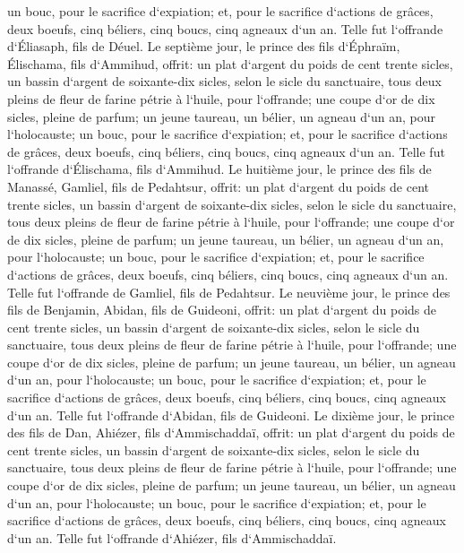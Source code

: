 \verse un bouc, pour le sacrifice d`expiation; 
\verse et, pour le sacrifice d`actions de grâces, deux boeufs, cinq béliers, cinq boucs, cinq agneaux d`un an. Telle fut l`offrande d`Éliasaph, fils de Déuel. 
\verse Le septième jour, le prince des fils d`Éphraïm, Élischama, fils d`Ammihud, 
\verse offrit: un plat d`argent du poids de cent trente sicles, un bassin d`argent de soixante-dix sicles, selon le sicle du sanctuaire, tous deux pleins de fleur de farine pétrie à l`huile, pour l`offrande; 
\verse une coupe d`or de dix sicles, pleine de parfum; 
\verse un jeune taureau, un bélier, un agneau d`un an, pour l`holocauste; 
\verse un bouc, pour le sacrifice d`expiation; 
\verse et, pour le sacrifice d`actions de grâces, deux boeufs, cinq béliers, cinq boucs, cinq agneaux d`un an. Telle fut l`offrande d`Élischama, fils d`Ammihud. 
\verse Le huitième jour, le prince des fils de Manassé, Gamliel, fils de Pedahtsur, 
\verse offrit: un plat d`argent du poids de cent trente sicles, un bassin d`argent de soixante-dix sicles, selon le sicle du sanctuaire, tous deux pleins de fleur de farine pétrie à l`huile, pour l`offrande; 
\verse une coupe d`or de dix sicles, pleine de parfum; 
\verse un jeune taureau, un bélier, un agneau d`un an, pour l`holocauste; 
\verse un bouc, pour le sacrifice d`expiation; 
\verse et, pour le sacrifice d`actions de grâces, deux boeufs, cinq béliers, cinq boucs, cinq agneaux d`un an. Telle fut l`offrande de Gamliel, fils de Pedahtsur. 
\verse Le neuvième jour, le prince des fils de Benjamin, Abidan, fils de Guideoni, 
\verse offrit: un plat d`argent du poids de cent trente sicles, un bassin d`argent de soixante-dix sicles, selon le sicle du sanctuaire, tous deux pleins de fleur de farine pétrie à l`huile, pour l`offrande; 
\verse une coupe d`or de dix sicles, pleine de parfum; 
\verse un jeune taureau, un bélier, un agneau d`un an, pour l`holocauste; 
\verse un bouc, pour le sacrifice d`expiation; 
\verse et, pour le sacrifice d`actions de grâces, deux boeufs, cinq béliers, cinq boucs, cinq agneaux d`un an. Telle fut l`offrande d`Abidan, fils de Guideoni. 
\verse Le dixième jour, le prince des fils de Dan, Ahiézer, fils d`Ammischaddaï, 
\verse offrit: un plat d`argent du poids de cent trente sicles, un bassin d`argent de soixante-dix sicles, selon le sicle du sanctuaire, tous deux pleins de fleur de farine pétrie à l`huile, pour l`offrande; 
\verse une coupe d`or de dix sicles, pleine de parfum; 
\verse un jeune taureau, un bélier, un agneau d`un an, pour l`holocauste; 
\verse un bouc, pour le sacrifice d`expiation; 
\verse et, pour le sacrifice d`actions de grâces, deux boeufs, cinq béliers, cinq boucs, cinq agneaux d`un an. Telle fut l`offrande d`Ahiézer, fils d`Ammischaddaï. 
